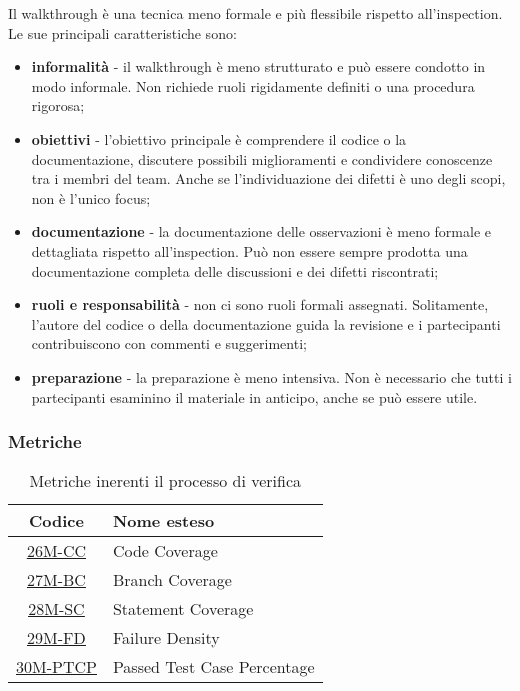 Il walkthrough è una tecnica meno formale e più flessibile rispetto all'inspection. Le sue principali caratteristiche sono:
\begin{itemize}
	\item \textbf{informalità} - il walkthrough è meno strutturato e può essere condotto in modo informale. Non richiede ruoli rigidamente definiti o una procedura rigorosa;
	\item \textbf{obiettivi} - l'obiettivo principale è comprendere il codice o la documentazione, discutere possibili miglioramenti e condividere conoscenze tra i membri del team. Anche se l'individuazione dei difetti è uno degli scopi, non è l'unico focus;
	\item \textbf{documentazione} - la documentazione delle osservazioni è meno formale e dettagliata rispetto all'inspection. Può non essere sempre prodotta una documentazione completa delle discussioni e dei difetti riscontrati;
	\item \textbf{ruoli e responsabilità} - non ci sono ruoli formali assegnati. Solitamente, l'autore del codice o della documentazione guida la revisione e i partecipanti contribuiscono con commenti e suggerimenti;
	\item \textbf{preparazione} - la preparazione è meno intensiva. Non è necessario che tutti i partecipanti esaminino il materiale in anticipo, anche se può essere utile.
\end{itemize}

\newpage

\subsubsection{Metriche}
\begin{table}[!h]
	\centering
	\begin{tabular}{|c|l|}
		\hline
		\textbf{Codice} & \textbf{Nome esteso}               					\\
		\hline
		\underline{\hyperlink{26M}{26M-CC}}     & Code Coverage   				\\
		\underline{\hyperlink{27M}{27M-BC}}     & Branch Coverage   			\\
		\underline{\hyperlink{28M}{28M-SC}}     & Statement Coverage   			\\
		\underline{\hyperlink{29M}{29M-FD}}     & Failure Density   			\\
		\underline{\hyperlink{30M}{30M-PTCP}}   & Passed Test Case Percentage   \\
		\hline
	\end{tabular}
	\caption{Metriche inerenti il processo di verifica}
\end{table}



